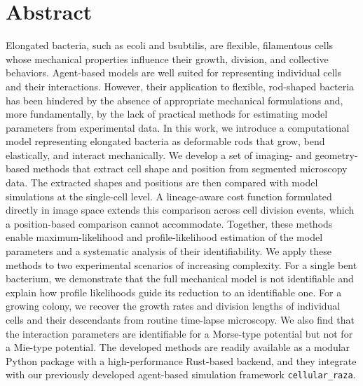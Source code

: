 \documentclass[10pt,letterpaper]{article}
\begin{document}
\section*{Abstract}
Elongated bacteria, such as \acl{ecoli} and \acl{bsubtilis}, are flexible, filamentous cells whose
mechanical properties influence their growth, division, and collective behaviors.
Agent-based models are well suited for representing individual cells and their interactions.
However, their application to flexible, rod-shaped bacteria has been hindered by the absence of
appropriate mechanical formulations and, more fundamentally, by the lack of practical methods for
estimating model parameters from experimental data.
In this work, we introduce a computational model representing elongated bacteria as deformable rods
that grow, bend elastically, and interact mechanically.
We develop a set of imaging- and geometry-based methods that extract cell shape and position from
segmented microscopy data.
The extracted shapes and positions are then compared with model simulations at the single-cell
level.
A lineage-aware cost function formulated directly in image space extends this comparison across cell
division events, which a position-based comparison cannot accommodate.
Together, these methods enable maximum-likelihood and profile-likelihood estimation of the model
parameters and a systematic analysis of their identifiability.
We apply these methods to two experimental scenarios of increasing complexity.
For a single bent bacterium, we demonstrate that the full mechanical model is not identifiable and
explain how profile likelihoods guide its reduction to an identifiable one.
For a growing colony, we recover the growth rates and division lengths of individual cells and their
descendants from routine time-lapse microscopy.
We also find that the interaction parameters are identifiable for a Morse-type potential but not for
a Mie-type potential.
The developed methods are readily available as a modular Python package with a high-performance
Rust-based backend, and they integrate with our previously developed agent-based simulation
framework \texttt{cellular\_raza}.
\end{document}
